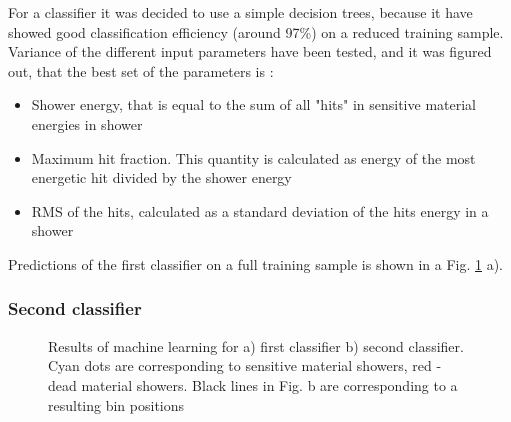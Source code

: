 For a classifier it was decided to use a simple decision trees, because it have showed good classification efficiency (around 97\%) on a reduced training sample. Variance of the different input parameters have been tested, and it was figured out, that the best set of the parameters is :

\begin{itemize}
\item Shower energy, that is equal to the sum of all "hits" in sensitive material energies in shower
\item Maximum hit fraction. This quantity is calculated as energy of the most energetic hit divided by the shower energy
\item RMS of the hits, calculated as a standard deviation of the hits energy in a shower
\end{itemize}

Predictions of the first classifier on a full training sample is shown in a Fig. \ref{fig:Class} a). 

\begin{figure}[!tbp]
\end{figure}

\subsubsection{Second classifier}

\begin{figure}[!tbp]
\begin{minipage}[h]{0.49\linewidth}
\end{minipage}
\hfill
\begin{minipage}[h]{0.49\linewidth}
\end{minipage}
\caption{Results of machine learning for a) first classifier b) second classifier. Cyan dots are corresponding to sensitive material showers, red - dead material showers. Black lines in Fig. b are corresponding to a resulting bin positions}
\label{fig:Class}
\end{figure}

